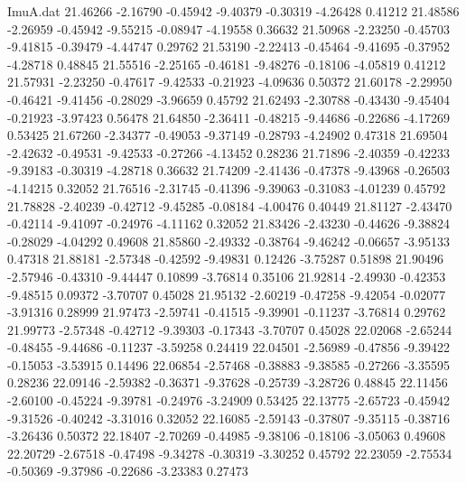 \begin{filecontents}{ImuA.dat}
  21.46266   -2.16790   -0.45942   -9.40379   -0.30319   -4.26428    0.41212
  21.48586   -2.26959   -0.45942   -9.55215   -0.08947   -4.19558    0.36632
  21.50968   -2.23250   -0.45703   -9.41815   -0.39479   -4.44747    0.29762
  21.53190   -2.22413   -0.45464   -9.41695   -0.37952   -4.28718    0.48845
  21.55516   -2.25165   -0.46181   -9.48276   -0.18106   -4.05819    0.41212
  21.57931   -2.23250   -0.47617   -9.42533   -0.21923   -4.09636    0.50372
  21.60178   -2.29950   -0.46421   -9.41456   -0.28029   -3.96659    0.45792
  21.62493   -2.30788   -0.43430   -9.45404   -0.21923   -3.97423    0.56478
  21.64850   -2.36411   -0.48215   -9.44686   -0.22686   -4.17269    0.53425
  21.67260   -2.34377   -0.49053   -9.37149   -0.28793   -4.24902    0.47318
  21.69504   -2.42632   -0.49531   -9.42533   -0.27266   -4.13452    0.28236
  21.71896   -2.40359   -0.42233   -9.39183   -0.30319   -4.28718    0.36632
  21.74209   -2.41436   -0.47378   -9.43968   -0.26503   -4.14215    0.32052
  21.76516   -2.31745   -0.41396   -9.39063   -0.31083   -4.01239    0.45792
  21.78828   -2.40239   -0.42712   -9.45285   -0.08184   -4.00476    0.40449
  21.81127   -2.43470   -0.42114   -9.41097   -0.24976   -4.11162    0.32052
  21.83426   -2.43230   -0.44626   -9.38824   -0.28029   -4.04292    0.49608
  21.85860   -2.49332   -0.38764   -9.46242   -0.06657   -3.95133    0.47318
  21.88181   -2.57348   -0.42592   -9.49831    0.12426   -3.75287    0.51898
  21.90496   -2.57946   -0.43310   -9.44447    0.10899   -3.76814    0.35106
  21.92814   -2.49930   -0.42353   -9.48515    0.09372   -3.70707    0.45028
  21.95132   -2.60219   -0.47258   -9.42054   -0.02077   -3.91316    0.28999
  21.97473   -2.59741   -0.41515   -9.39901   -0.11237   -3.76814    0.29762
  21.99773   -2.57348   -0.42712   -9.39303   -0.17343   -3.70707    0.45028
  22.02068   -2.65244   -0.48455   -9.44686   -0.11237   -3.59258    0.24419
  22.04501   -2.56989   -0.47856   -9.39422   -0.15053   -3.53915    0.14496
  22.06854   -2.57468   -0.38883   -9.38585   -0.27266   -3.35595    0.28236
  22.09146   -2.59382   -0.36371   -9.37628   -0.25739   -3.28726    0.48845
  22.11456   -2.60100   -0.45224   -9.39781   -0.24976   -3.24909    0.53425
  22.13775   -2.65723   -0.45942   -9.31526   -0.40242   -3.31016    0.32052
  22.16085   -2.59143   -0.37807   -9.35115   -0.38716   -3.26436    0.50372
  22.18407   -2.70269   -0.44985   -9.38106   -0.18106   -3.05063    0.49608
  22.20729   -2.67518   -0.47498   -9.34278   -0.30319   -3.30252    0.45792
  22.23059   -2.75534   -0.50369   -9.37986   -0.22686   -3.23383    0.27473

\end{filecontents}
